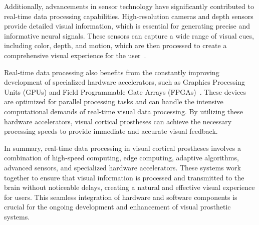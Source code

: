 \documentclass[twocolumn,10pt]{article}
\begin{document}
Additionally, advancements in sensor technology have significantly contributed
to real-time data processing capabilities. High-resolution cameras and depth
sensors provide detailed visual information, which is essential for generating
precise and informative neural signals. These sensors can capture a wide range
of visual cues, including color, depth, and motion, which are then processed to
create a comprehensive visual experience for the
user~\parencite{rueckauerExperiencingProstheticVision2022}.

Real-time data processing also benefits from the constantly improving development of specialized
hardware accelerators, such as Graphics Processing Units (GPUs) and Field
Programmable Gate Arrays
(FPGAs)~\parencite{springerOnDeviceDeepLearning2021,fengDesignOnlineBrainComputer2020}.
These devices are optimized for parallel processing tasks and can handle the
intensive computational demands of real-time visual data processing. By
utilizing these hardware accelerators, visual cortical prostheses can achieve
the necessary processing speeds to provide immediate and accurate visual
feedback.

In summary, real-time data processing in visual cortical prostheses involves a
combination of high-speed computing, edge computing, adaptive algorithms,
advanced sensors, and specialized hardware accelerators. These systems work
together to ensure that visual information is processed and transmitted to the
brain without noticeable delays, creating a natural and effective visual
experience for users. This seamless integration of hardware and software
components is crucial for the ongoing development and enhancement of visual
prosthetic systems.
\end{document}
